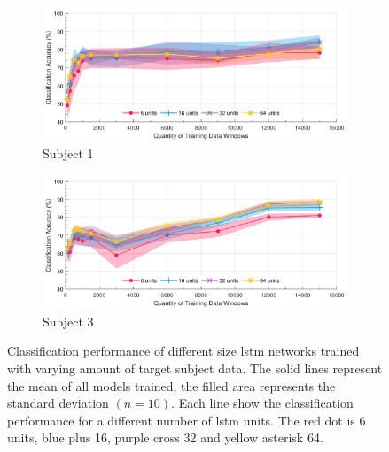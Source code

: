 \begin{figure}[p]
    \centering
    \begin{subfigure}[b]{\textwidth}
        \centering
        \includegraphics[width=\textwidth]{content/5-Personalisation/Bespoke_Target/ch5_bespoke_target_model_subject_1.pdf}
        \caption{Subject 1}
        \label{fig:ch5_6_unit_bespoke_model}
    \end{subfigure}
    \begin{subfigure}[b]{\textwidth}
        \centering
        \includegraphics[width=\textwidth]{content/5-Personalisation/Bespoke_Target/ch5_bespoke_target_model_subject_3.pdf}
        \caption{Subject 3}
        \label{fig:ch5_16_unit_bespoke_model}
    \end{subfigure}
    \caption[Classification performance of different size  networks trained with varying amount of target subject data]{Classification performance of different size \acrshort{lstm} networks trained with varying amount of target subject data. The solid lines represent the mean of all models trained, the filled area represents the standard deviation $(n=10)$. Each line show the classification performance for a different number of \acrshort{lstm} units. The red dot is 6 units, blue plus 16, purple cross 32 and yellow asterisk 64.}
    \label{fig:ch5_bespoke_mode_classification}
\end{figure}
